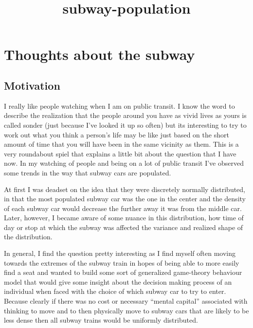 \documentclass[11pt]{article}
\title{subway-population}
\begin{document}
    
    \maketitle
    
    

    
    \hypertarget{thoughts-about-the-subway}{%
\section{Thoughts about the subway}\label{thoughts-about-the-subway}}

    \hypertarget{motivation}{%
\subsection{Motivation}\label{motivation}}

I really like people watching when I am on public transit. I know the
word to describe the realization that the people around you have as
vivid lives as yours is called sonder (just because I've looked it up so
often) but its interesting to try to work out what you think a person's
life may be like just based on the short amount of time that you will
have been in the same vicinity as them. This is a very roundabout spiel
that explains a little bit about the question that I have now. In my
watching of people and being on a lot of public transit I've observed
some trends in the way that subway cars are populated.

At first I was deadset on the idea that they were discretely normally
distributed, in that the most populated subway car was the one in the
center and the density of each subway car would decrease the further
away it was from the middle car. Later, however, I became aware of some
nuance in this distribution, how time of day or stop at which the subway
was affected the variance and realized shape of the distribution.

In general, I find the question pretty interesting as I find myself
often moving towards the extremes of the subway train in hopes of being
able to more easily find a seat and wanted to build some sort of
generalized game-theory behaviour model that would give some insight
about the decision making process of an individual when faced with the
choice of which subway car to try to enter. Because clearly if there was
no cost or necessary ``mental capital'' associated with thinking to move
and to then physically move to subway cars that are likely to be less
dense then all subway trains would be uniformly distributed.
\end{document}
